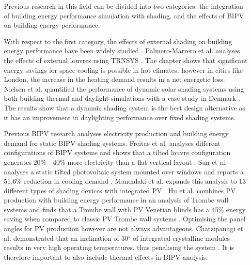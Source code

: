 
Previous research in this field can be divided into two categories: the integration of building energy performance simulation with shading, and the effects of BIPV on building energy performance. 

With respect to the first category, the effects of external shading on building energy performance have been widely studied \cite{bellia2014overview}. Palmero-Marrero et al. analyses the effects of external louvres using TRNSYS \cite{palmero2010effect}. The chapter shows that significant energy savings for space cooling is possible in hot climates, however in cities like London, the increase in the heating demand results in a net energetic loss. Nielsen et al. quantified the performance of dynamic solar shading systems using both building thermal and daylight simulations with a case study in Denmark \cite{nielsen2011quantifying}. The results show that a dynamic shading system is the best design alternative as it has an improvement in daylighting performance over fixed shading systems.\ 

Previous BIPV research analyses electricity production and building energy demand for static BIPV shading systems. Freitas et al. analyses different configurations of BIPV systems and shows that a tilted louvre configuration generates 20\% - 40\% more electricity than a flat vertical layout \cite{freitas2015maximizing}. Sun et al. analyses a static tilted photovoltaic system mounted over windows and reports a 51.6\% reduction in cooling demand \cite{sun2012optimum}. Mandalaki et al. expands this analysis to 13 different types of shading devices with integrated PV \cite{mandalaki2012assessment}. Hu et al. combines PV production with building energy performance in an analysis of Trombe wall systems and finds that a Trombe wall with PV Venetian blinds has a 45\% energy saving when compared to classic PV Trombe wall systems \cite{hu2017comparative}. Optimising the panel angles for PV production however are not always advantageous. Chatzipanagi et al. demonstrated that an inclination of 30$^{\circ}$ of integrated crystalline modules results in very high operating temperatures, thus penalising the system \cite{chatzipanagi2016bipv}. It is therefore important to also include thermal effects in BIPV analysis. \\


